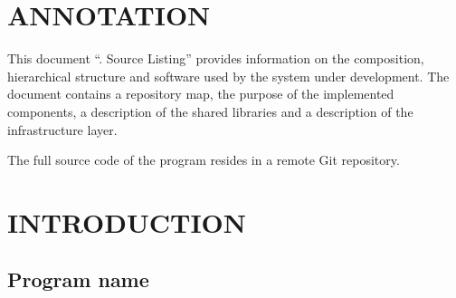 \documentclass[12pt,a4paper]{extarticle}
\begin{document}
\sloppy






\section*{ANNOTATION}

This document \enquote{\projectname. Source Listing} provides information on the composition, hierarchical structure and software used by the system under development. The document contains a repository map, the purpose of the implemented components, a description of the shared libraries and a description of the infrastructure layer.

The full source code of the program resides in a remote Git repository. 

\clearpage

\hypersetup{linkcolor=black}
\tableofcontents
\hypersetup{linkcolor=blue}
\thispagestyle{fancy}
\clearpage

\section{INTRODUCTION}

\subsection{Program name}
\end{document}
